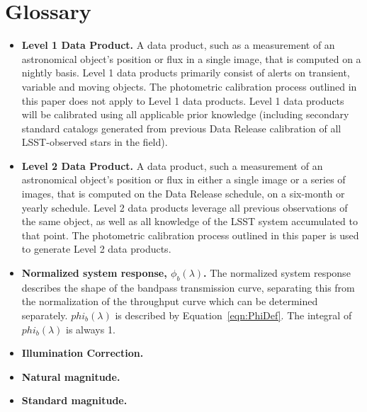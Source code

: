 \documentclass[12pt,preprint]{aastex}
\begin{document}



\section{Glossary}
\label{sec:glossary}

\begin{itemize}

\item{{\bf Level 1 Data Product.} A data product, such as a measurement
  of an astronomical object's position or flux in a single image, that
is computed on a nightly basis. Level 1 data products primarily
consist of alerts on transient, variable and moving objects. The
photometric calibration process outlined in this paper does not apply
to Level 1 data products. Level 1 data products will be calibrated
using all applicable prior knowledge (including secondary standard
catalogs generated from previous Data Release calibration of all
LSST-observed stars in the field). }

\item{{\bf Level 2 Data Product.} A data product, such a measurement
    of an astronomical object's position or flux in either a single
    image or a series of images, that is computed on the Data Release
    schedule, on a six-month or yearly schedule. Level 2 data products
    leverage all previous observations of the same object, as well as
    all knowledge of the LSST system accumulated to that point. The
    photometric calibration process outlined in this paper is used to
    generate Level 2 data products. }

\item{{\bf Normalized system response, $\phi_b(\lambda)$.} The
    normalized system response describes the shape of the bandpass
    transmission curve, separating this from the normalization of the
    throughput curve which can be determined separately.
    $phi_b(\lambda)$ is described by Equation~\ref{eqn:PhiDef}. The
    integral of $phi_b(\lambda)$ is always 1. }

\item{{\bf Illumination Correction.} }

\item{{\bf Natural magnitude.}} 

\item{{\bf Standard magnitude.}}

\end{itemize}
\end{document}
